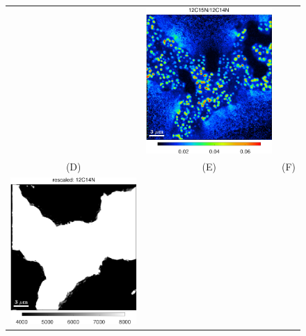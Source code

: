 \begin{figure}[!ht]
\begin{tabular}{ccc}
&
\includegraphics[scale=\sc, valign=t]{figs6/12C15N-12C14N}
\\
(D) & (E) & (F) \\
\includegraphics[scale=\sc, valign=t]{figs6/12C14Nb}

\end{tabular}
\end{figure}
